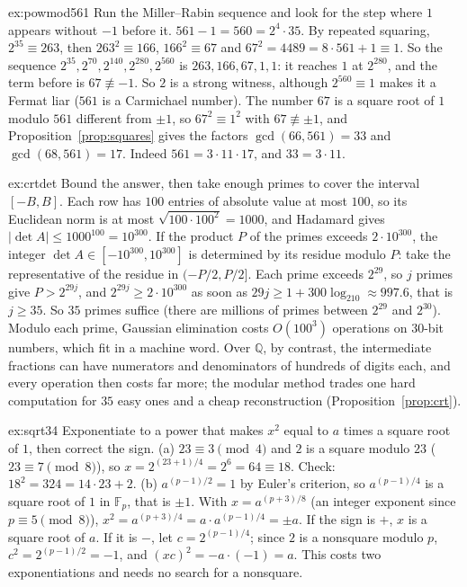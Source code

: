 \begin{solution}{ex:powmod561}
\idea Run the Miller--Rabin sequence and look for the step where $1$ appears without $-1$ before it.
\writeup $561-1=560=2^4\cdot35$. By repeated squaring, $2^{35}\equiv263$, then $263^2\equiv166$, $166^2\equiv67$ and $67^2=4489=8\cdot561+1\equiv1$. So the sequence $2^{35},2^{70},2^{140},2^{280},2^{560}$ is $263,166,67,1,1$: it reaches $1$ at $2^{280}$, and the term before is $67\not\equiv-1$. So $2$ is a strong witness, although $2^{560}\equiv1$ makes it a Fermat liar ($561$ is a Carmichael number).
The number $67$ is a square root of $1$ modulo $561$ different from $\pm1$, so $67^2\equiv1^2$ with $67\not\equiv\pm1$, and Proposition~\ref{prop:squares} gives the factors $\gcd(66,561)=33$ and $\gcd(68,561)=17$. Indeed $561=3\cdot11\cdot17$, and $33=3\cdot11$.
\end{solution}

\begin{solution}{ex:crtdet}
\idea Bound the answer, then take enough primes to cover the interval $[-B,B]$.
\writeup Each row has $100$ entries of absolute value at most $100$, so its Euclidean norm is at most $\sqrt{100\cdot100^2}=1000$, and Hadamard gives $|\det A|\le1000^{100}=10^{300}$. If the product $P$ of the primes exceeds $2\cdot10^{300}$, the integer $\det A\in[-10^{300},10^{300}]$ is determined by its residue modulo $P$: take the representative of the residue in $(-P/2,P/2]$.
Each prime exceeds $2^{29}$, so $j$ primes give $P>2^{29j}$, and $2^{29j}\ge2\cdot10^{300}$ as soon as $29j\ge1+300\log_210\approx997.6$, that is $j\ge35$. So $35$ primes suffice (there are millions of primes between $2^{29}$ and $2^{30}$). Modulo each prime, Gaussian elimination costs $O(100^3)$ operations on $30$-bit numbers, which fit in a machine word.
Over $\mathbb Q$, by contrast, the intermediate fractions can have numerators and denominators of hundreds of digits each, and every operation then costs far more; the modular method trades one hard computation for $35$ easy ones and a cheap reconstruction (Proposition~\ref{prop:crt}).
\end{solution}

\begin{solution}{ex:sqrt34}
\idea Exponentiate to a power that makes $x^2$ equal to $a$ times a square root of $1$, then correct the sign.
\writeup (a) $23\equiv3\pmod4$ and $2$ is a square modulo $23$ ($23\equiv7\pmod8$), so $x=2^{(23+1)/4}=2^6=64\equiv18$. Check: $18^2=324=14\cdot23+2$.
(b) $a^{(p-1)/2}=1$ by Euler's criterion, so $a^{(p-1)/4}$ is a square root of $1$ in $\mathbb F_p$, that is $\pm1$. With $x=a^{(p+3)/8}$ (an integer exponent since $p\equiv5\pmod8$), $x^2=a^{(p+3)/4}=a\cdot a^{(p-1)/4}=\pm a$. If the sign is $+$, $x$ is a square root of $a$. If it is $-$, let $c=2^{(p-1)/4}$; since $2$ is a nonsquare modulo $p$, $c^2=2^{(p-1)/2}=-1$, and $(xc)^2=-a\cdot(-1)=a$.
This costs two exponentiations and needs no search for a nonsquare.
\end{solution}


